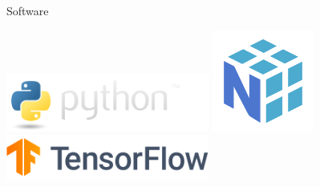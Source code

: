 \documentclass[handout]{beamer}
\begin{document}
\begin{frame}{Software}
    \begin{center}
    \href{https://www.python.org}{\includegraphics[max width=0.5\textwidth, max height=0.4\textheight]{images/python}}
    \href{https://www.numpy.org}{\includegraphics[max width=0.25\textwidth, max height=0.4\textheight]{images/numpy}}\newline
    \vspace{0.1\textheight}
    \newline
    \href{https://www.tensorflow.org}{\includegraphics[max width=0.5\textwidth, max height=0.4\textheight]{images/tensorflow}}
    \end{center}
\end{frame}
\end{document}
